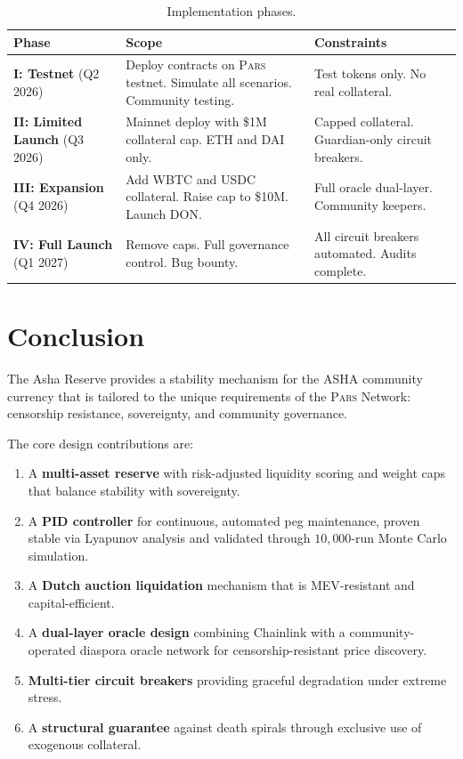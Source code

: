 \documentclass[11pt,a4paper]{article}
\newcommand{\Pars}{\textsc{Pars}\xspace}
\newcommand{\asha}{\textsc{ASHA}\xspace}
\begin{document}
\begin{table}[H]
\centering
\caption{Implementation phases.}
\label{tab:roadmap}
\begin{tabular}{@{}lp{5cm}p{4.5cm}@{}}
\toprule
\textbf{Phase} & \textbf{Scope} & \textbf{Constraints} \\
\midrule
\textbf{I: Testnet} (Q2 2026) & Deploy contracts on \Pars testnet. Simulate all scenarios. Community testing. & Test tokens only. No real collateral. \\
\addlinespace
\textbf{II: Limited Launch} (Q3 2026) & Mainnet deploy with \$1M collateral cap. ETH and DAI only. & Capped collateral. Guardian-only circuit breakers. \\
\addlinespace
\textbf{III: Expansion} (Q4 2026) & Add WBTC and USDC collateral. Raise cap to \$10M. Launch DON. & Full oracle dual-layer. Community keepers. \\
\addlinespace
\textbf{IV: Full Launch} (Q1 2027) & Remove caps. Full governance control. Bug bounty. & All circuit breakers automated. Audits complete. \\
\bottomrule
\end{tabular}
\end{table}

\section{Conclusion}
\label{sec:conclusion}

The Asha Reserve provides a stability mechanism for the \asha community currency that is tailored to the unique requirements of the \Pars Network: censorship resistance, sovereignty, and community governance.

The core design contributions are:

\begin{enumerate}
  \item A \textbf{multi-asset reserve} with risk-adjusted liquidity scoring and weight caps that balance stability with sovereignty.
  \item A \textbf{PID controller} for continuous, automated peg maintenance, proven stable via Lyapunov analysis and validated through $10{,}000$-run Monte Carlo simulation.
  \item A \textbf{Dutch auction liquidation} mechanism that is MEV-resistant and capital-efficient.
  \item A \textbf{dual-layer oracle design} combining Chainlink with a community-operated diaspora oracle network for censorship-resistant price discovery.
  \item \textbf{Multi-tier circuit breakers} providing graceful degradation under extreme stress.
  \item A \textbf{structural guarantee} against death spirals through exclusive use of exogenous collateral.
\end{enumerate}
\end{document}
